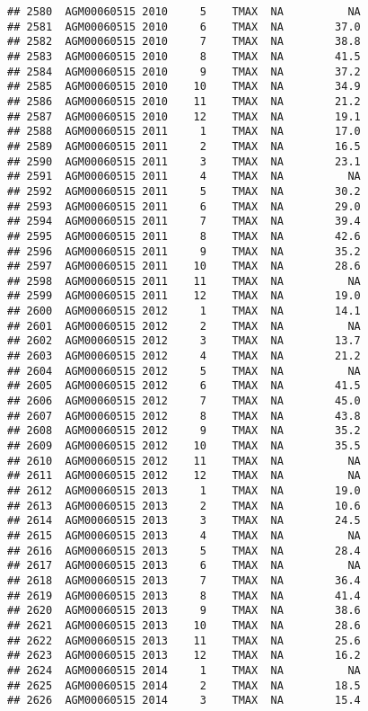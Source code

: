 \documentclass{article}\usepackage[]{graphicx}\usepackage[]{color}
\makeatletter
\newenvironment{kframe}{%
 \def\at@end@of@kframe{}%
 \ifinner\ifhmode%
  \def\at@end@of@kframe{\end{minipage}}%
  \begin{minipage}{\columnwidth}%
 \fi\fi%
 \def\FrameCommand##1{\hskip\@totalleftmargin \hskip-\fboxsep
 \colorbox{shadecolor}{##1}\hskip-\fboxsep
     \hskip-\linewidth \hskip-\@totalleftmargin \hskip\columnwidth}%
 \MakeFramed {\advance\hsize-\width
   \@totalleftmargin\z@ \linewidth\hsize
   \@setminipage}}%
 {\par\unskip\endMakeFramed%
 \at@end@of@kframe}
\newenvironment{knitrout}{}{} %
\makeatother
\begin{document}
\begin{knitrout}
\begin{kframe}
\begin{verbatim}
## 2580  AGM00060515 2010     5    TMAX  NA          NA
## 2581  AGM00060515 2010     6    TMAX  NA        37.0
## 2582  AGM00060515 2010     7    TMAX  NA        38.8
## 2583  AGM00060515 2010     8    TMAX  NA        41.5
## 2584  AGM00060515 2010     9    TMAX  NA        37.2
## 2585  AGM00060515 2010    10    TMAX  NA        34.9
## 2586  AGM00060515 2010    11    TMAX  NA        21.2
## 2587  AGM00060515 2010    12    TMAX  NA        19.1
## 2588  AGM00060515 2011     1    TMAX  NA        17.0
## 2589  AGM00060515 2011     2    TMAX  NA        16.5
## 2590  AGM00060515 2011     3    TMAX  NA        23.1
## 2591  AGM00060515 2011     4    TMAX  NA          NA
## 2592  AGM00060515 2011     5    TMAX  NA        30.2
## 2593  AGM00060515 2011     6    TMAX  NA        29.0
## 2594  AGM00060515 2011     7    TMAX  NA        39.4
## 2595  AGM00060515 2011     8    TMAX  NA        42.6
## 2596  AGM00060515 2011     9    TMAX  NA        35.2
## 2597  AGM00060515 2011    10    TMAX  NA        28.6
## 2598  AGM00060515 2011    11    TMAX  NA          NA
## 2599  AGM00060515 2011    12    TMAX  NA        19.0
## 2600  AGM00060515 2012     1    TMAX  NA        14.1
## 2601  AGM00060515 2012     2    TMAX  NA          NA
## 2602  AGM00060515 2012     3    TMAX  NA        13.7
## 2603  AGM00060515 2012     4    TMAX  NA        21.2
## 2604  AGM00060515 2012     5    TMAX  NA          NA
## 2605  AGM00060515 2012     6    TMAX  NA        41.5
## 2606  AGM00060515 2012     7    TMAX  NA        45.0
## 2607  AGM00060515 2012     8    TMAX  NA        43.8
## 2608  AGM00060515 2012     9    TMAX  NA        35.2
## 2609  AGM00060515 2012    10    TMAX  NA        35.5
## 2610  AGM00060515 2012    11    TMAX  NA          NA
## 2611  AGM00060515 2012    12    TMAX  NA          NA
## 2612  AGM00060515 2013     1    TMAX  NA        19.0
## 2613  AGM00060515 2013     2    TMAX  NA        10.6
## 2614  AGM00060515 2013     3    TMAX  NA        24.5
## 2615  AGM00060515 2013     4    TMAX  NA          NA
## 2616  AGM00060515 2013     5    TMAX  NA        28.4
## 2617  AGM00060515 2013     6    TMAX  NA          NA
## 2618  AGM00060515 2013     7    TMAX  NA        36.4
## 2619  AGM00060515 2013     8    TMAX  NA        41.4
## 2620  AGM00060515 2013     9    TMAX  NA        38.6
## 2621  AGM00060515 2013    10    TMAX  NA        28.6
## 2622  AGM00060515 2013    11    TMAX  NA        25.6
## 2623  AGM00060515 2013    12    TMAX  NA        16.2
## 2624  AGM00060515 2014     1    TMAX  NA          NA
## 2625  AGM00060515 2014     2    TMAX  NA        18.5
## 2626  AGM00060515 2014     3    TMAX  NA        15.4

\end{verbatim}
\end{kframe}
\end{knitrout}
\end{document}
